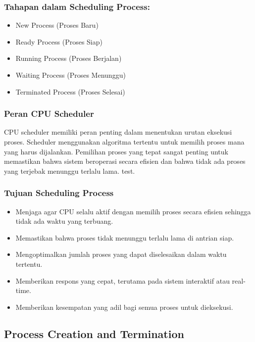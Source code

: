\documentclass[12pt]{article}
\begin{document}
\subsubsection{Tahapan dalam Scheduling Process:}
\begin{itemize}
    \item New Process (Proses Baru)
    \item Ready Process (Proses Siap)
    \item Running Process (Proses Berjalan)
    \item Waiting Process (Proses Menunggu)
    \item Terminated Process (Proses Selesai)
\end{itemize}
\subsubsection{Peran CPU Scheduler}
\hspace{1cm}
CPU scheduler memiliki peran penting dalam menentukan urutan eksekusi proses. Scheduler menggunakan algoritma tertentu untuk memilih proses mana yang harus dijalankan. Pemilihan proses yang tepat sangat penting untuk memastikan bahwa sistem beroperasi secara efisien dan bahwa tidak ada proses yang terjebak menunggu terlalu lama.
test.
\subsubsection{Tujuan Scheduling Process}
\begin{itemize}
    \item Menjaga agar CPU selalu aktif dengan memilih proses secara efisien sehingga tidak ada waktu yang terbuang.
    \item Memastikan bahwa proses tidak menunggu terlalu lama di antrian siap.
    \item Mengoptimalkan jumlah proses yang dapat diselesaikan dalam waktu tertentu.
    \item Memberikan respons yang cepat, terutama pada sistem interaktif atau real-time.
    \item Memberikan kesempatan yang adil bagi semua proses untuk dieksekusi.
\end{itemize}



\subsection{Process Creation and Termination}
\end{document}
